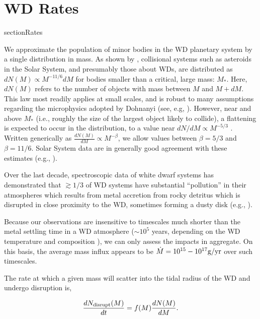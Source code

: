 \section{WD Rates}
section{Rates}


We approximate the population of minor bodies in the WD planetary system by a single distribution in mass.  As shown by \citet{Dohnanyi_1969}, collisional systems such as asteroids in the Solar System, and presumably those about WDs, are distributed as $dN(M) \propto M^{-11/6} dM$ for bodies smaller than a critical, large mass: $M_*$.  Here, $dN(M)$ refers to the number of objects with mass between $M$ and $M+dM$.  This law most readily applies at small scales, and is robust to many assumptions regarding the microphysics adopted by Dohnanyi (see, e.g, \citealt{Williams_Wetherill_1994,Campo_Bagatin_1994}).  However, near and above $M_*$ (i.e., roughly the size of the largest object likely to collide), a flattening is expected to occur in the distribution, to a value near $dN/dM \propto M^{-5/3}$ \citep{Klacka_1992,Safronov_1979,Anders_1965}.  Written generically as $\frac{dN(M)}{dM} \propto M^{-\beta}$, we allow values between $\beta =5/3$ and $\beta = 11/6$.  Solar System data are in generally good agreement with these estimates (e.g., \citealt{Schlichting_2013,Fuentes_2010}).


Over the last decade, spectroscopic data of white dwarf systems has demonstrated that $\gtrsim 1/3$ of WD systems have substantial ``pollution'' in their atmospheres which results from metal accretion from rocky detritus which is disrupted in close proximity to the WD, sometimes forming a dusty disk (e.g., \citealt{Jura_2003, Jura_2008, Jura_2007, Jura_2007b, Reach_2009, Zuckerman_2010, Zuckerman_2012, Farihi_2012, Farihi_2013,Xu_2013}).


Because our observations are insensitive to timescales much shorter than the metal settling time in a WD atmosphere ($\sim 10^5$ years, depending on the WD temperature and composition \citealt{Koester_2009}), we can only assess the impacts in aggregate.  On this basis, the average mass influx appears to be $\dot{M} = 10^{15}-10^{17}{\rm g/yr}$ \citep{Zuckerman_2010,Barber_2012} over such timescales.  


The rate at which a given mass will scatter into the tidal radius of the WD and undergo disruption is,


\begin{equation}
\frac{dN_{\rm disrupt}(M)}{dt} = f(M) \frac{dN(M)}{dM}.
\end{equation}


